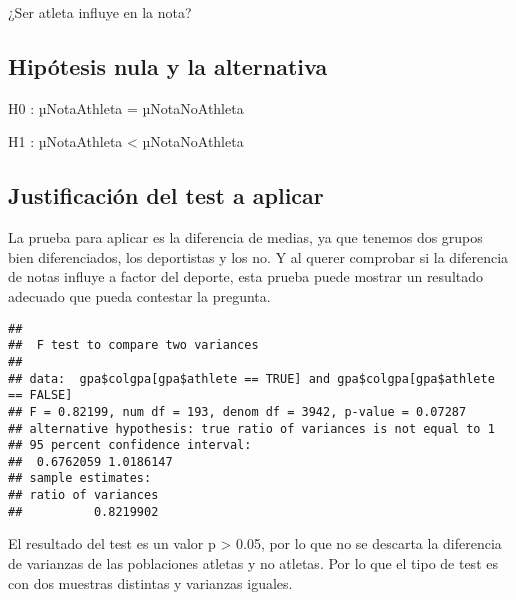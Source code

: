 \documentclass[
]{article}
\newenvironment{Shaded}{\begin{snugshade}}{\end{snugshade}}
\newcommand{\CommentTok}[1]{\textcolor[rgb]{0.50,0.62,0.50}{#1}}
\newcommand{\ConstantTok}[1]{\textcolor[rgb]{0.86,0.64,0.64}{\textbf{#1}}}
\newcommand{\FunctionTok}[1]{\textcolor[rgb]{0.94,0.94,0.56}{#1}}
\newcommand{\NormalTok}[1]{\textcolor[rgb]{0.80,0.80,0.80}{#1}}
\newcommand{\SpecialCharTok}[1]{\textcolor[rgb]{0.86,0.64,0.64}{#1}}
\begin{document}
¿Ser atleta influye en la nota?

\hypertarget{hipuxf3tesis-nula-y-la-alternativa}{%
\subsection{Hipótesis nula y la
alternativa}\label{hipuxf3tesis-nula-y-la-alternativa}}

H0 : µNotaAthleta = µNotaNoAthleta

H1 : µNotaAthleta \textless{} µNotaNoAthleta

\hypertarget{justificaciuxf3n-del-test-a-aplicar}{%
\subsection{Justificación del test a
aplicar}\label{justificaciuxf3n-del-test-a-aplicar}}

La prueba para aplicar es la diferencia de medias, ya que tenemos dos
grupos bien diferenciados, los deportistas y los no. Y al querer
comprobar si la diferencia de notas influye a factor del deporte, esta
prueba puede mostrar un resultado adecuado que pueda contestar la
pregunta.

\begin{Shaded}
\end{Shaded}

\begin{verbatim}
## 
##  F test to compare two variances
## 
## data:  gpa$colgpa[gpa$athlete == TRUE] and gpa$colgpa[gpa$athlete == FALSE]
## F = 0.82199, num df = 193, denom df = 3942, p-value = 0.07287
## alternative hypothesis: true ratio of variances is not equal to 1
## 95 percent confidence interval:
##  0.6762059 1.0186147
## sample estimates:
## ratio of variances 
##          0.8219902
\end{verbatim}

El resultado del test es un valor p \textgreater{} 0.05, por lo que no
se descarta la diferencia de varianzas de las poblaciones atletas y no
atletas. Por lo que el tipo de test es con dos muestras distintas y
varianzas iguales.
\end{document}
